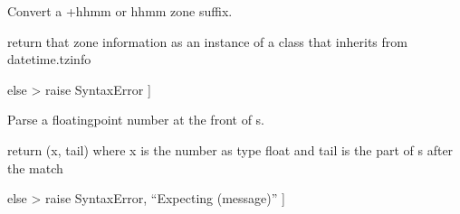 \documentclass[letterpaper,10pt,english]{sphinxmanual}
\begin{document}

\begin{fulllineitems}
\label{\detokenize{api/killMS.Data:killMS.Data.sidereal.parseFixedZone}}
\pysigstartsignatures
{}
\pysigstopsignatures
\sphinxAtStartPar
Convert a +hhmm or \sphinxhyphen{}hhmm zone suffix.
\begin{description}
\sphinxlineitem{{[} s is a string \sphinxhyphen{}\textgreater{}}\begin{description}
\sphinxAtStartPar
return that zone information as an instance of a class
that inherits from datetime.tzinfo

\end{description}

\sphinxAtStartPar
else \sphinxhyphen{}\textgreater{} raise SyntaxError {]}

\end{description}

\end{fulllineitems}


\begin{fulllineitems}
\label{\detokenize{api/killMS.Data:killMS.Data.sidereal.parseFloat}}
\pysigstartsignatures
{}
\pysigstopsignatures
\sphinxAtStartPar
Parse a floating\sphinxhyphen{}point number at the front of s.
\begin{description}
\sphinxlineitem{{[} (s is a string) and}\begin{description}
\begin{description}
\sphinxAtStartPar
return (x, tail) where x is the number as type float
and tail is the part of s after the match

\end{description}

\sphinxAtStartPar
else \sphinxhyphen{}\textgreater{} raise SyntaxError, “Expecting (message)” {]}

\end{description}

\end{description}

\end{fulllineitems}
\end{document}
